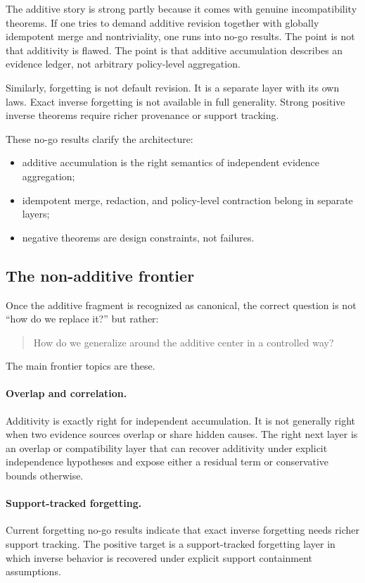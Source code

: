 \documentclass[11pt]{article}
\begin{document}
The additive story is strong partly because it comes with genuine incompatibility theorems. If one tries to demand additive revision together with globally idempotent merge and nontriviality, one runs into no-go results. The point is not that additivity is flawed. The point is that additive accumulation describes an evidence ledger, not arbitrary policy-level aggregation.

Similarly, forgetting is not default revision. It is a separate layer with its own laws. Exact inverse forgetting is not available in full generality. Strong positive inverse theorems require richer provenance or support tracking.

These no-go results clarify the architecture:

\begin{itemize}
  \item additive accumulation is the right semantics of independent evidence aggregation;
  \item idempotent merge, redaction, and policy-level contraction belong in separate layers;
  \item negative theorems are design constraints, not failures.
\end{itemize}

\subsection{The non-additive frontier}

Once the additive fragment is recognized as canonical, the correct question is not ``how do we replace it?'' but rather:

\begin{quote}
How do we generalize around the additive center in a controlled way?
\end{quote}

The main frontier topics are these.

\paragraph{Overlap and correlation.}
Additivity is exactly right for independent accumulation. It is not generally right when two evidence sources overlap or share hidden causes. The right next layer is an overlap or compatibility layer that can recover additivity under explicit independence hypotheses and expose either a residual term or conservative bounds otherwise.

\paragraph{Support-tracked forgetting.}
Current forgetting no-go results indicate that exact inverse forgetting needs richer support tracking. The positive target is a support-tracked forgetting layer in which inverse behavior is recovered under explicit support containment assumptions.
\end{document}
